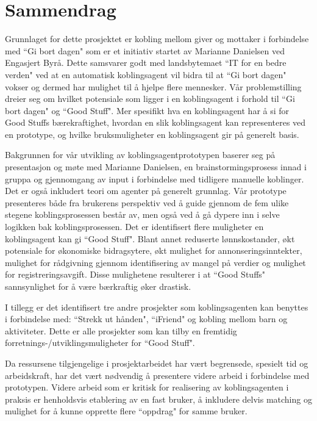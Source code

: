 \section{Sammendrag}
Grunnlaget for dette prosjektet er kobling mellom giver og mottaker i forbindelse med ``Gi bort dagen" som er et initiativ startet av Marianne Danielsen ved Engasjert Byrå. Dette samsvarer godt med landsbytemaet ``IT for en bedre verden" ved at en automatisk koblingsagent vil bidra til at ``Gi bort dagen" vokser og dermed har mulighet til å hjelpe flere mennesker. Vår problemstilling dreier seg om hvilket potensiale som ligger i en koblingsagent i forhold til ``Gi bort dagen" og ``Good Stuff". Mer spesifikt hva en koblingsagent har å si for Good Stuffs bærekraftighet, hvordan en slik koblingsagent kan representeres ved en prototype, og hvilke bruksmuligheter en koblingsagent gir på generelt basis. 

Bakgrunnen for vår utvikling av koblingsagentprototypen baserer seg på presentasjon og møte med Marianne Danielsen, en brainstormingsprosess innad i gruppa og gjennomgang av input i forbindelse med tidligere manuelle koblinger. Det er også inkludert teori om agenter på generelt grunnlag. Vår prototype presenteres både fra brukerens perspektiv ved å guide gjennom de fem ulike stegene koblingsprosessen består av, men også ved å gå dypere inn i selve logikken bak koblingsprosessen. Det er identifisert flere muligheter en koblingsagent kan gi ``Good Stuff". Blant annet reduserte lønnskostander, økt potensiale for økonomiske bidragsytere, økt mulighet for annonseringsinntekter, mulighet for rådgivning gjennom identifisering av mangel på verdier og mulighet for registreringsavgift. Disse mulighetene resulterer i at ``Good Stuffs" sannsynlighet for å være bærkraftig øker drastisk. 

I tillegg er det identifisert tre andre prosjekter som koblingsagenten kan benyttes i forbindelse med: ``Strekk ut hånden", ``iFriend" og kobling mellom barn og aktiviteter. Dette er alle prosjekter som kan tilby en fremtidig forretnings-/utviklingsmuligheter for ``Good Stuff". 

Da ressursene tilgjengelige i prosjektarbeidet har vært begrensede, spesielt tid og arbeidskraft, har det vært nødvendig å presentere videre arbeid i forbindelse med prototypen. Videre arbeid som er kritisk for realisering av koblingsagenten i praksis er henholdsvis etablering av en fast bruker, å inkludere delvis matching og mulighet for å kunne opprette flere ``oppdrag" for samme bruker. 
